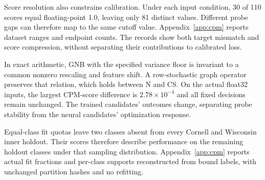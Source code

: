 Score resolution also constrains calibration. Under each input condition, 30 of 110 scores equal floating-point 1.0, leaving only 81 distinct values. Different probe gaps can therefore map to the same cutoff value. Appendix~\ref{app:cpm} reports dataset ranges and endpoint counts. The records show both target mismatch and score compression, without separating their contributions to calibrated loss.

In exact arithmetic, GNB with the specified variance floor is invariant to a common nonzero rescaling and feature shift. A row-stochastic graph operator preserves that relation, which holds between N and CS. On the actual float32 inputs, the largest CPM-score difference is $2.78\times10^{-4}$ and all fixed decisions remain unchanged. The trained candidates' outcomes change, separating probe stability from the neural candidates' optimization response.

Equal-class fit quotas leave two classes absent from every Cornell and Wisconsin inner holdout. Their scores therefore describe performance on the remaining holdout classes under that sampling distribution. Appendix~\ref{app:cpm} reports actual fit fractions and per-class supports reconstructed from bound labels, with unchanged partition hashes and no refitting.
